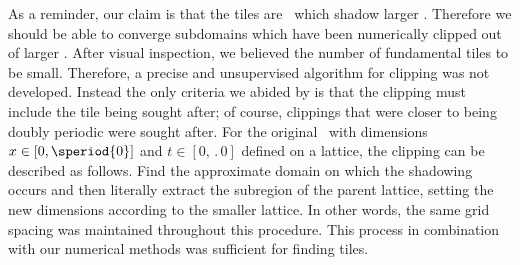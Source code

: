As a reminder, our claim is that the tiles are \twots\ which shadow larger \twots.
Therefore we should be able to converge subdomains which have been numerically clipped out
of larger \twots. After visual inspection, we believed the number of fundamental tiles to
be small. Therefore, a precise and unsupervised algorithm for clipping was not developed.
Instead the only criteria we abided by is that the clipping must include the tile being
sought after; of course, clippings that were closer to being doubly periodic were sought after.
For the original \twot\ with dimensions $x \in [0, \speriod{0}]$ and $t \in [0, \period{0}]$ defined on a lattice, the
clipping can be described as follows. Find the approximate domain on which
the shadowing occurs and then literally extract the subregion of the parent lattice,
setting the new {\spt} dimensions according to the smaller lattice. In other words,
the same grid spacing was maintained throughout this procedure.
This process in combination with our numerical methods was sufficient
for finding tiles.

